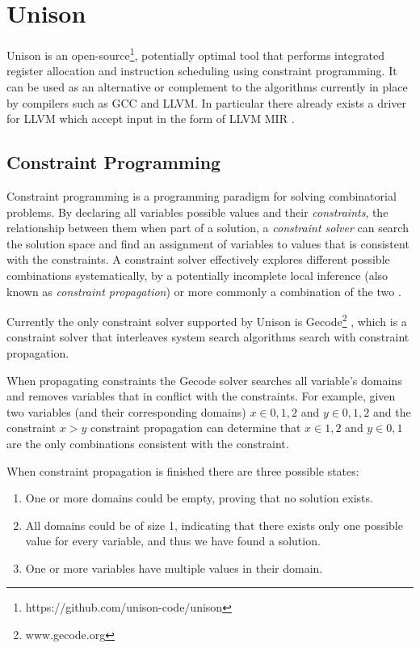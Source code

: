 \section{Unison}
\label{sec:unison}

Unison is an open-source\footnote{https://github.com/unison-code/unison},
potentially optimal tool that performs integrated register allocation and instruction
scheduling using constraint programming. It can be used as an alternative or complement to
the algorithms currently in place by compilers such as GCC and LLVM. In particular there
already exists a driver for LLVM which accept input in the form of LLVM MIR \cite{unison-docs}.

\subsection{Constraint Programming}

Constraint programming is a programming paradigm for solving combinatorial problems.
By declaring all variables possible values and their \textit{constraints}, the relationship
between them when part of a solution, a \textit{constraint solver} can search the solution
space and find an assignment of variables to values that is consistent with the constraints.
A constraint solver effectively explores different possible combinations systematically,
by a potentially incomplete local inference (also known as \textit{constraint propagation})
or more commonly a combination of the two \cite{handbook-constraint-programming}.

Currently the only constraint solver supported by Unison is Gecode\footnote{www.gecode.org}
\cite{unison-docs}, which is a constraint solver that interleaves system search algorithms
search with constraint propagation\cite{MPG}.

When propagating constraints the Gecode solver searches all variable's domains and removes
variables that in conflict with the constraints\cite[Section~23.1]{MPG}. For example,
given two variables (and their corresponding domains) $x \in {0,1,2}$ and $y \in {0,1,2}$
and the constraint $x > y$ constraint propagation can determine that $x \in {1, 2}$ and
$y \in {0, 1}$ are the only combinations consistent with the constraint.

When constraint propagation is finished there are three possible states:

\begin{enumerate}
	\item One or more domains could be empty, proving that no solution exists.
	\item	All domains could be of size 1, indicating that there exists only one possible
		value for every variable, and thus we have found a solution.
	\item One or more variables have multiple values in their domain.
\end{enumerate}

